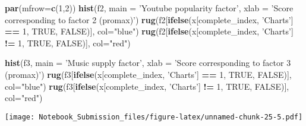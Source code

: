 \documentclass[
]{article}
\newenvironment{Shaded}{\begin{snugshade}}{\end{snugshade}}
\newcommand{\DataTypeTok}[1]{\textcolor[rgb]{0.13,0.29,0.53}{#1}}
\newcommand{\DecValTok}[1]{\textcolor[rgb]{0.00,0.00,0.81}{#1}}
\newcommand{\KeywordTok}[1]{\textcolor[rgb]{0.13,0.29,0.53}{\textbf{#1}}}
\newcommand{\NormalTok}[1]{#1}
\newcommand{\OperatorTok}[1]{\textcolor[rgb]{0.81,0.36,0.00}{\textbf{#1}}}
\newcommand{\OtherTok}[1]{\textcolor[rgb]{0.56,0.35,0.01}{#1}}
\newcommand{\StringTok}[1]{\textcolor[rgb]{0.31,0.60,0.02}{#1}}
\begin{document}
\begin{Shaded}
\begin{Highlighting}[]
\KeywordTok{par}\NormalTok{(}\DataTypeTok{mfrow=}\KeywordTok{c}\NormalTok{(}\DecValTok{1}\NormalTok{,}\DecValTok{2}\NormalTok{))}
\KeywordTok{hist}\NormalTok{(f2, }\DataTypeTok{main =} \StringTok{'Youtube popularity factor'}\NormalTok{, }\DataTypeTok{xlab =} \StringTok{'Score corresponding to factor 2 (promax)'}\NormalTok{)}
\KeywordTok{rug}\NormalTok{(f2[}\KeywordTok{ifelse}\NormalTok{(x[complete_index, }\StringTok{'Charts'}\NormalTok{] }\OperatorTok{==}\StringTok{ }\DecValTok{1}\NormalTok{, }\OtherTok{TRUE}\NormalTok{, }\OtherTok{FALSE}\NormalTok{)], }\DataTypeTok{col=}\StringTok{"blue"}\NormalTok{)}
\KeywordTok{rug}\NormalTok{(f2[}\KeywordTok{ifelse}\NormalTok{(x[complete_index, }\StringTok{'Charts'}\NormalTok{] }\OperatorTok{!=}\StringTok{ }\DecValTok{1}\NormalTok{, }\OtherTok{TRUE}\NormalTok{, }\OtherTok{FALSE}\NormalTok{)], }\DataTypeTok{col=}\StringTok{"red"}\NormalTok{)}

\KeywordTok{hist}\NormalTok{(f3, }\DataTypeTok{main =} \StringTok{'Music supply factor'}\NormalTok{, }\DataTypeTok{xlab =} \StringTok{'Score corresponding to factor 3 (promax)'}\NormalTok{)}
\KeywordTok{rug}\NormalTok{(f3[}\KeywordTok{ifelse}\NormalTok{(x[complete_index, }\StringTok{'Charts'}\NormalTok{] }\OperatorTok{==}\StringTok{ }\DecValTok{1}\NormalTok{, }\OtherTok{TRUE}\NormalTok{, }\OtherTok{FALSE}\NormalTok{)], }\DataTypeTok{col=}\StringTok{"blue"}\NormalTok{)}
\KeywordTok{rug}\NormalTok{(f3[}\KeywordTok{ifelse}\NormalTok{(x[complete_index, }\StringTok{'Charts'}\NormalTok{] }\OperatorTok{!=}\StringTok{ }\DecValTok{1}\NormalTok{, }\OtherTok{TRUE}\NormalTok{, }\OtherTok{FALSE}\NormalTok{)], }\DataTypeTok{col=}\StringTok{"red"}\NormalTok{)}
\end{Highlighting}
\end{Shaded}

\texttt{[image: Notebook\_Submission\_files/figure-latex/unnamed-chunk-25-5.pdf]}
\end{document}
